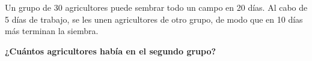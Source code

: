 \question[10] Un grupo de 30 agricultores puede sembrar todo un campo en 20 días. Al cabo de 5 días de trabajo,
se les unen agricultores de otro grupo, de modo que en 10 días
más terminan la siembra.

\textbf{¿Cuántos agricultores había en el segundo grupo?}\\

\begin{solutionbox}{4cm}

\end{solutionbox}